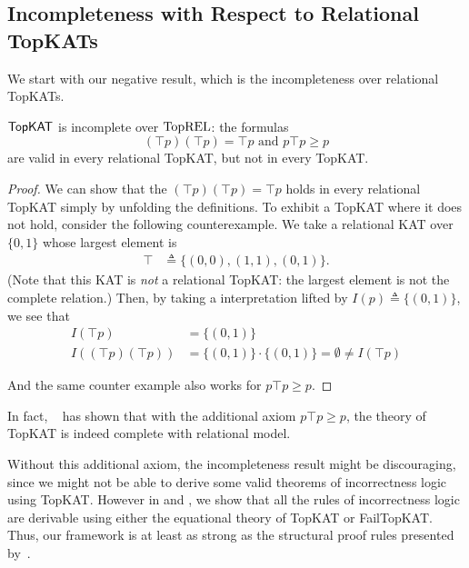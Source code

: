 \subsection{Incompleteness with Respect to Relational TopKATs}

We start with our negative result, which is the incompleteness over relational TopKATs.

\begin{theorem}\label{the: topkatstar incomplete over relational model}
  \(\mathsf{TopKAT}\) is incomplete over \(\mathbf{\mathrm{TopREL}}\): the formulas
  \[(⊤ p) (⊤ p) = ⊤ p \text{ and } p ⊤ p ≥ p\] 
  are valid in every relational TopKAT, but not in every TopKAT\@.
\end{theorem}

\begin{proof}
  We can show that the \((⊤ p) (⊤ p) = ⊤ p\) 
  holds in every relational TopKAT simply by
  unfolding the definitions.  To exhibit a TopKAT where it does not hold,
  consider the following counterexample.  We take a relational KAT over
  \(\{0,1\}\) whose largest element is
  \begin{align*}
    ⊤ & ≜ \{(0,0), (1,1), (0,1)\}.
  \end{align*}
  (Note that this KAT is \emph{not} a relational TopKAT\@: the largest
  element is not the complete relation.)
  Then, by taking a interpretation lifted by \(I(p) ≜\{(0, 1)\}\), we see that
  \begin{align*}
    I(⊤ p) & = \{(0, 1)\} \\
    I((⊤ p) (⊤ p)) & 
        = \{(0, 1)\} ⋅ \{(0, 1)\} 
        = ∅ ≠ I(⊤ p)
  \end{align*}

  And the same counter example also works for 
  \(p ⊤ p ≥ p\).
\end{proof}

In fact, \citeauthor{Pous_Wagemaker_2022}~\cite{Pous_Wagemaker_2023,Pous_Wagemaker_2022} has shown that with the additional axiom \(p ⊤ p ≥ p\), the theory of TopKAT is indeed complete with relational model.

Without this additional axiom, the incompleteness result might be discouraging, since we might not be able to derive some valid theorems of incorrectness logic using TopKAT. However in  and , we show that all the rules of incorrectness logic are derivable using either the equational theory of TopKAT or FailTopKAT\@.  Thus,
our framework is at least as strong as the structural proof rules presented by~\citet{OHearn_2020}.

